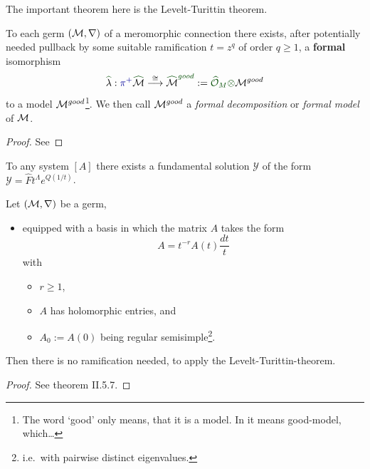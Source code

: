 The important theorem here is the Levelt-Turittin theorem.
\begin{thm}
  To each germ $(\mathcal{M},\nabla)$ of a meromorphic connection there exists, after
  potentially needed \textcolor{blue!60!black}{pullback by some suitable
  ramification $t=z^q$ of order $q\geq1$}, a
  \textcolor{green!30!black}{\textbf{formal}} isomorphism
  \[
    \textcolor{green!30!black}{\hat{\textcolor{black}{\lambda}}}:
    \textcolor{blue!60!black}{\pi^{+}}
    \textcolor{green!30!black}{\hat{\textcolor{black}{\cM}}}
    \overset{\cong}\longrightarrow
    \textcolor{green!30!black}{\hat{\textcolor{black}{\cM}}^{good}}
    :=\textcolor{green!30!black}{\hat\cO_M\otimes}\cM^{good}
  \]
  to a model $\mathcal{M}^{good}$\footnote{The word `good' only means, that it is a
  model. In \cite{sabbah2007isomonodromic} it means good-model,
  which\dots\TODO}.
  We then call $\mathcal{M}^{good}$ a \emph{formal decomposition} or \emph{formal
  model} of $\mathcal{M}$.
\end{thm}
\begin{proof}
  See \TODO
\end{proof}
\begin{cor}
  To any system $[A]$ there exists a fundamental solution $\mathcal{Y}$ of the
  form $\mathcal{Y}=\hat F t^\Lambda e^{Q(1/t)}$.
\end{cor}

\begin{prop}
  Let $(\mathcal{M},\nabla)$ be a germ,
  \begin{itemize}
    \item equipped with a basis in which the matrix $A$ takes the form
      \[
        A=t^{-r}A(t)\frac{dt}{t}
      \]
      with
      \begin{itemize}
        \item $r\geq1$,
        \item $A$ has holomorphic entries, and
        \item $A_0:=A(0)$ being regular semisimple\footnote{i.e.\ with
          pairwise distinct eigenvalues.}.
      \end{itemize}
  \end{itemize}
  Then there is no ramification needed, to apply the Levelt-Turittin-theorem.
  \begin{comment}
    Further, all the summands $\cR_\phi$ have rank one, which is not the case
    in general.
  \end{comment}
\end{prop}
\begin{proof}
  See \cite{sabbah2007isomonodromic} theorem II.5.7.
\end{proof}

